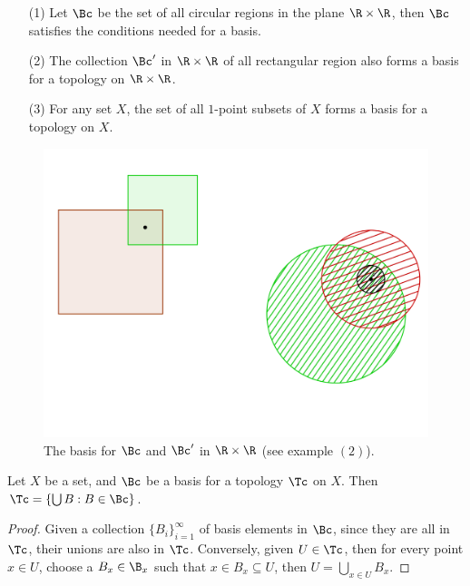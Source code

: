 \begin{example}
    \begin{enumerate}
        \item[(1)] Let $\Bc$ be the set of all circular regions in the plane  $\R \times \R$, then
            $\Bc$ satisfies the conditions needed for a basis.

        \item[(2)] The collection  $\Bc'$ in  $\R \times \R$ of all rectangular region also
            forms a basis for a topology on  $\R \times \R$.

        \item[(3)] For any set  $X$, the set of all  $1$-point subsets of  $X$ forms a
            basis for a topology on  $X$.
    \end{enumerate}
\end{example}

\begin{figure}[h]
    \centering
    \includegraphics[scale = 0.3]{Figures/Chapter1/basesOfCircularRectangularRegions.png}
    \caption{The basis for $\Bc$ and  $\Bc'$ in  $\R \times \R$  (see example $(2)$).}
    \label{fig_1.2}
\end{figure}

\begin{lemma}\label{1.2.2}
    Let $X$ be a set, and  $\Bc$ be a basis for a topology  $\Tc$ on  $X$. Then
    $\Tc=\{\bigcup{B}: B \in \Bc\}$.
\end{lemma}
\begin{proof}
    Given a collection $\{B_i\}_{i=1}^{\infty}$ of basis elements in  $\Bc$, since they
    are all in  $\Tc$, their unions are also in $\Tc$. Conversely, given  $U \in \Tc$,
    then for every point $x \in U$, choose a  $B_x \in \B_x$ such that  $x \in B_x
    \subseteq U$, then  $U=\bigcup_{x \in U}{B_x}$.
\end{proof}

